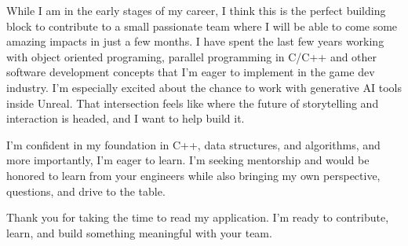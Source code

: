 \documentclass[11pt,a4paper,roman]{moderncv}
\begin{document}
While I am in the early stages of my career, I think this is the perfect building block to contribute to a small passionate team where I will be able to come some amazing impacts in just a few months. I have spent the last few years working with object oriented programing, parallel programming in C/C++ and other software development concepts that I'm eager to implement in the game dev industry. I’m especially excited about the chance to work with generative AI tools inside Unreal. That intersection feels like where the future of storytelling and interaction is headed, and I want to help build it.

I’m confident in my foundation in C++, data structures, and algorithms, and more importantly, I’m eager to learn. I'm seeking mentorship and would be honored to learn from your engineers while also bringing my own perspective, questions, and drive to the table.

Thank you for taking the time to read my application. I’m ready to contribute, learn, and build something meaningful with your team.


\vspace{0.5cm}

\makeletterclosing
\end{document}

